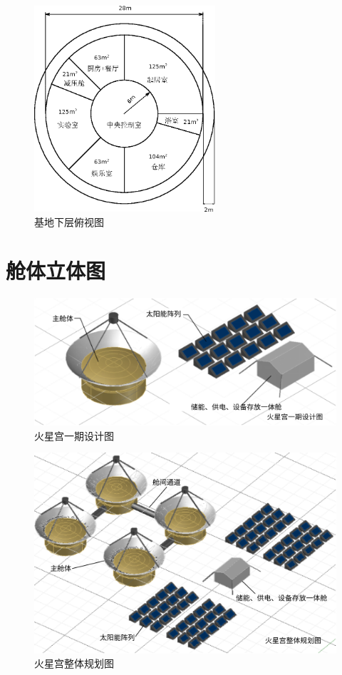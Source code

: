 \begin{figure}[H]
        \centering
        \includegraphics[width=0.6\textwidth]{figure/xiaceng.eps}
        \caption{基地下层俯视图}
        \label{fig:xiaceng}
\end{figure}

\section{舱体立体图}
\label{sec:3d-view}

\begin{figure}[H]
  \centering
  \includegraphics[width=\textwidth]{figure/一期设计图.png}
  \caption{火星宫一期设计图}
\end{figure}

\begin{figure}[H]
  \centering
  \includegraphics[width=\textwidth]{figure/整体规划图.png}
  \caption{火星宫整体规划图}
\end{figure}
